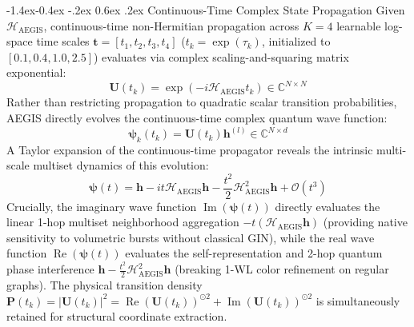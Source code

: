 \documentclass[10pt,twocolumn,letterpaper]{article}
\makeatletter
\renewcommand\subsection{\@startsection{subsection}{2}{\z@}%
                                     {-1.4ex\@plus -0.4ex \@minus -.2ex}%
                                     {0.6ex \@plus .2ex}%
                                     {\normalfont\normalsize\bfseries}}
\makeatother
\begin{document}
\subsection{Continuous-Time Complex State Propagation}
Given $\mathcal{H}_{\text{AEGIS}}$, continuous-time non-Hermitian propagation across $K=4$ learnable log-space time scales $\mathbf{t} = [t_1, t_2, t_3, t_4]$ ($t_k = \exp(\tau_k)$, initialized to $[0.1, 0.4, 1.0, 2.5]$) evaluates via complex scaling-and-squaring matrix exponential:
\begin{equation}
\mathbf{U}(t_k) = \exp\left(-i \mathcal{H}_{\text{AEGIS}} t_k\right) \in \mathbb{C}^{N \times N}
\end{equation}
Rather than restricting propagation to quadratic scalar transition probabilities, AEGIS directly evolves the continuous-time complex quantum wave function:
\begin{equation}
\boldsymbol{\psi}_k(t_k) = \mathbf{U}(t_k) \mathbf{h}^{(l)} \in \mathbb{C}^{N \times d}
\end{equation}
A Taylor expansion of the continuous-time propagator reveals the intrinsic multi-scale multiset dynamics of this evolution:
\begin{equation}
\boldsymbol{\psi}(t) = \mathbf{h} - i t \mathcal{H}_{\text{AEGIS}} \mathbf{h} - \frac{t^2}{2} \mathcal{H}_{\text{AEGIS}}^2 \mathbf{h} + \mathcal{O}(t^3)
\end{equation}
Crucially, the imaginary wave function $\operatorname{Im}(\boldsymbol{\psi}(t))$ directly evaluates the linear 1-hop multiset neighborhood aggregation $-t (\mathcal{H}_{\text{AEGIS}} \mathbf{h})$ (providing native sensitivity to volumetric bursts without classical GIN), while the real wave function $\operatorname{Re}(\boldsymbol{\psi}(t))$ evaluates the self-representation and 2-hop quantum phase interference $\mathbf{h} - \frac{t^2}{2} \mathcal{H}_{\text{AEGIS}}^2 \mathbf{h}$ (breaking 1-WL color refinement on regular graphs). The physical transition density $\mathbf{P}(t_k) = |\mathbf{U}(t_k)|^2 = \operatorname{Re}(\mathbf{U}(t_k))^{\odot 2} + \operatorname{Im}(\mathbf{U}(t_k))^{\odot 2}$ is simultaneously retained for structural coordinate extraction.
\end{document}
